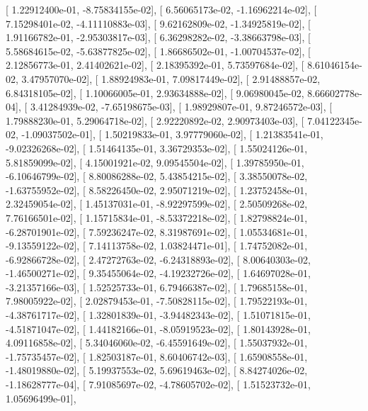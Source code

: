 \documentclass{article}
\begin{document}
       [  1.22912400e-01,  -8.75834155e-02],
       [  6.56065173e-02,  -1.16962214e-02],
       [  7.15298401e-02,  -4.11110883e-03],
       [  9.62162809e-02,  -1.34925819e-02],
       [  1.91166782e-01,  -2.95303817e-03],
       [  6.36298282e-02,  -3.38663798e-03],
       [  5.58684615e-02,  -5.63877825e-02],
       [  1.86686502e-01,  -1.00704537e-02],
       [  2.12856773e-01,   2.41402621e-02],
       [  2.18395392e-01,   5.73597684e-02],
       [  8.61046154e-02,   3.47957070e-02],
       [  1.88924983e-01,   7.09817449e-02],
       [  2.91488857e-02,   6.84318105e-02],
       [  1.10066005e-01,   2.93634888e-02],
       [  9.06980045e-02,   8.66602778e-04],
       [  3.41284939e-02,  -7.65198675e-03],
       [  1.98929807e-01,   9.87246572e-03],
       [  1.79888230e-01,   5.29064718e-02],
       [  2.92220892e-02,   2.90973403e-03],
       [  7.04122345e-02,  -1.09037502e-01],
       [  1.50219833e-01,   3.97779060e-02],
       [  1.21383541e-01,  -9.02326268e-02],
       [  1.51464135e-01,   3.36729353e-02],
       [  1.55024126e-01,   5.81859099e-02],
       [  4.15001921e-02,   9.09545504e-02],
       [  1.39785950e-01,  -6.10646799e-02],
       [  8.80086288e-02,   5.43854215e-02],
       [  3.38550078e-02,  -1.63755952e-02],
       [  8.58226450e-02,   2.95071219e-02],
       [  1.23752458e-01,   2.32459054e-02],
       [  1.45137031e-01,  -8.92297599e-02],
       [  2.50509268e-02,   7.76166501e-02],
       [  1.15715834e-01,  -8.53372218e-02],
       [  1.82798824e-01,  -6.28701901e-02],
       [  7.59236247e-02,   8.31987691e-02],
       [  1.05534681e-01,  -9.13559122e-02],
       [  7.14113758e-02,   1.03824471e-01],
       [  1.74752082e-01,  -6.92866728e-02],
       [  2.47272763e-02,  -6.24318893e-02],
       [  8.00640303e-02,  -1.46500271e-02],
       [  9.35455064e-02,  -4.19232726e-02],
       [  1.64697028e-01,  -3.21357166e-03],
       [  1.52525733e-01,   6.79466387e-02],
       [  1.79685158e-01,   7.98005922e-02],
       [  2.02879453e-01,  -7.50828115e-02],
       [  1.79522193e-01,  -4.38761717e-02],
       [  1.32801839e-01,  -3.94482343e-02],
       [  1.51071815e-01,  -4.51871047e-02],
       [  1.44182166e-01,  -8.05919523e-02],
       [  1.80143928e-01,   4.09116858e-02],
       [  5.34046060e-02,  -6.45591649e-02],
       [  1.55037932e-01,  -1.75735457e-02],
       [  1.82503187e-01,   8.60406742e-03],
       [  1.65908558e-01,  -1.48019880e-02],
       [  5.19937553e-02,   5.69619463e-02],
       [  8.84274026e-02,  -1.18628777e-04],
       [  7.91085697e-02,  -4.78605702e-02],
       [  1.51523732e-01,   1.05696499e-01],
\end{document}
